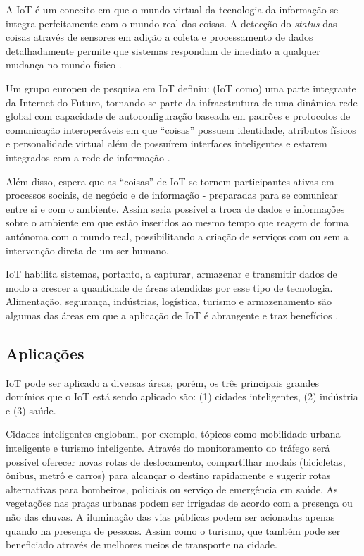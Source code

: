 A IoT é um conceito em que o mundo virtual da tecnologia da informação se 
integra perfeitamente com o mundo real das coisas. A detecção do \textit{status}
das coisas através de sensores em adição a coleta e processamento de dados
detalhadamente permite que sistemas respondam de imediato a qualquer mudança
no mundo físico \cite{uckelmann2011architectural}.

Um grupo europeu de pesquisa em IoT definiu: (IoT como) uma parte integrante da
Internet do Futuro, tornando-se parte da infraestrutura de uma dinâmica rede
global com capacidade de autoconfiguração baseada em padrões e protocolos
de comunicação interoperáveis em que ``coisas'' possuem identidade, atributos
físicos e personalidade virtual além de possuírem interfaces inteligentes e
estarem integrados com a rede de informação \cite{cerpiot2009}.

Além disso,  espera que as ``coisas''
de IoT se tornem participantes ativas em processos sociais, de negócio e de 
informação - preparadas para se comunicar entre si e com o ambiente. Assim seria possível
a troca de dados e informações sobre o ambiente em que estão inseridos ao mesmo
tempo que reagem de forma autônoma com o mundo real, possibilitando a criação
de serviços com ou sem a intervenção direta de um ser humano.


IoT habilita sistemas, portanto, a capturar, armazenar e transmitir dados de modo a
crescer a quantidade de áreas atendidas por esse tipo de tecnologia.
Alimentação, segurança, indústrias, logística, turismo e armazenamento são
algumas das áreas em que a aplicação de IoT é abrangente e traz benefícios
\cite{xu2014ubiquitous}.

\subsection{Aplicações} \label{subsec:iot-aplicacoes}

IoT pode ser aplicado a diversas áreas, porém, os três principais grandes 
domínios que o IoT está sendo aplicado são: (1) cidades inteligentes, 
(2) indústria e (3) saúde.

Cidades inteligentes englobam, por exemplo, tópicos como mobilidade urbana
inteligente e turismo inteligente. Através do monitoramento do tráfego será
possível oferecer novas rotas de deslocamento, compartilhar modais (bicicletas,
ônibus, metrô e carros) para alcançar o destino rapidamente e sugerir rotas
alternativas para bombeiros, policiais ou serviço de emergência em saúde. As
vegetações nas praças urbanas podem ser irrigadas de acordo com a presença ou
não das chuvas. A iluminação das vias públicas podem ser acionadas apenas
quando na presença de pessoas. Assim como o turismo, que também pode ser
beneficiado através de melhores meios de transporte na cidade. 

